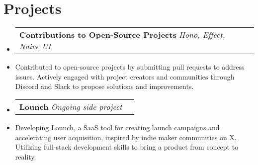 \documentclass[letterpaper,11pt]{article}
\makeatletter
\newcommand{\resumeItem}[1]{
  \item\small{
    {#1 \vspace{-2pt}}
  }
}
\newcommand{\resumeProjectHeading}[2]{
    \item
    \begin{tabular*}{0.97\textwidth}{l@{\extracolsep{\fill}}r}
      \small#1 & #2 \\
    \end{tabular*}\vspace{-7pt}
}
\newcommand{\resumeSubHeadingListStart}{\begin{itemize}[leftmargin=0.15in, label={}]}
\newcommand{\resumeSubHeadingListEnd}{\end{itemize}}
\makeatother
\begin{document}
\section{Projects}
    \resumeSubHeadingListStart
      \resumeProjectHeading
          {\textbf{Contributions to Open-Source Projects} \emph{Hono, Effect, Naive UI} }{}
          \resumeItem{Contributed to open-source projects by submitting pull requests to address issues. Actively engaged with project creators and communities through Discord and Slack to propose solutions and improvements.}
      \resumeProjectHeading
          {\textbf{Lounch} \emph{Ongoing side project}}{}
            \resumeItem{Developing Lounch, a SaaS tool for creating launch campaigns and accelerating user acquisition, inspired by indie maker communities on X. Utilizing full-stack development skills to bring a product from concept to reality.}
    \resumeSubHeadingListEnd
\end{document}
